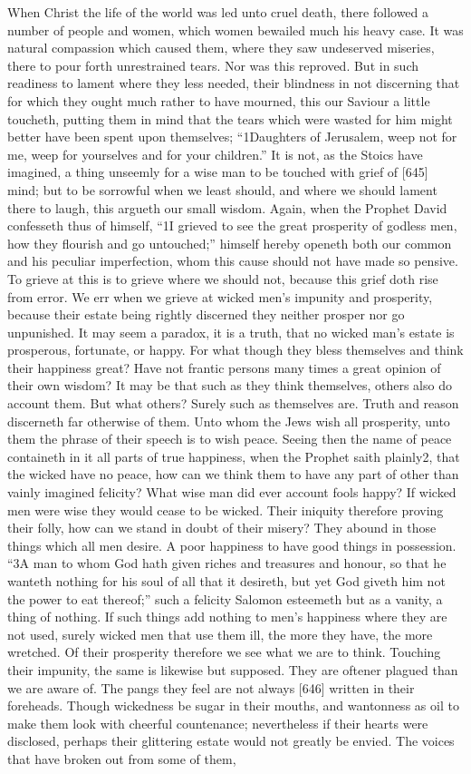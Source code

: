 When Christ the life of the world was led unto cruel death, there followed a number of people and women, which women bewailed much his heavy case. It was natural compassion which caused them, where they saw undeserved miseries, there to pour forth unrestrained tears. Nor was this reproved. But in such readiness to lament where they less needed, their blindness in not discerning that for which they ought much rather to have mourned, this our Saviour a little toucheth, putting them in mind that the tears which were wasted for him might better have been spent upon themselves; “1Daughters of Jerusalem, weep not for me, weep for yourselves and for your children.” It is not, as the Stoics have imagined, a thing unseemly for a wise man to be touched with grief of [645] mind; but to be sorrowful when we least should, and where we should lament there to laugh, this argueth our small wisdom. Again, when the Prophet David confesseth thus of himself, “1I grieved to see the great prosperity of godless men, how they flourish and go untouched;” himself hereby openeth both our common and his peculiar imperfection, whom this cause should not have made so pensive. To grieve at this is to grieve where we should not, because this grief doth rise from error. We err when we grieve at wicked men’s impunity and prosperity, because their estate being rightly discerned they neither prosper nor go unpunished. It may seem a paradox, it is a truth, that no wicked man’s estate is prosperous, fortunate, or happy. For what though they bless themselves and think their happiness great? Have not frantic persons many times a great opinion of their own wisdom? It may be that such as they think themselves, others also do account them. But what others? Surely such as themselves are. Truth and reason discerneth far otherwise of them. Unto whom the Jews wish all prosperity, unto them the phrase of their speech is to wish peace. Seeing then the name of peace containeth in it all parts of true happiness, when the Prophet saith plainly2, that the wicked have no peace, how can we think them to have any part of other than vainly imagined felicity? What wise man did ever account fools happy? If wicked men were wise they would cease to be wicked. Their iniquity therefore proving their folly, how can we stand in doubt of their misery? They abound in those things which all men desire. A poor happiness to have good things in possession. “3A man to whom God hath given riches and treasures and honour, so that he wanteth nothing for his soul of all that it desireth, but yet God giveth him not the power to eat thereof;” such a felicity Salomon esteemeth but as a vanity, a thing of nothing. If such things add nothing to men’s happiness where they are not used, surely wicked men that use them ill, the more they have, the more wretched. Of their prosperity therefore we see what we are to think. Touching their impunity, the same is likewise but supposed. They are oftener plagued than we are aware of. The pangs they feel are not always [646] written in their foreheads. Though wickedness be sugar in their mouths, and wantonness as oil to make them look with cheerful countenance; nevertheless if their hearts were disclosed, perhaps their glittering estate would not greatly be envied. The voices that have broken out from some of them, 